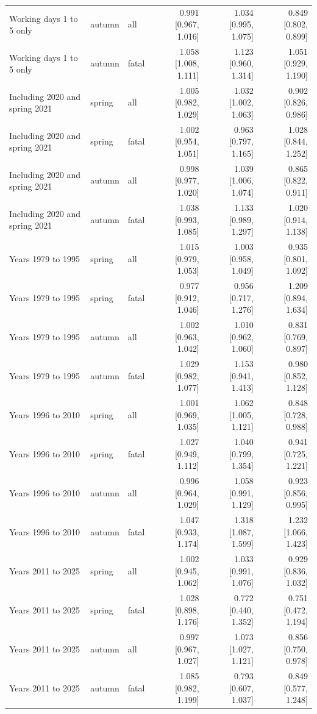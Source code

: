 \documentclass[11pt,a4paper]{article}
\begin{document}
{\begin{longtable}{p{5.6cm}llrrr}
Working days 1 to 5 only & autumn & all & 0.991 [0.967, 1.016] & 1.034 [0.995, 1.075] & 0.849 [0.802, 0.899]\\
Working days 1 to 5 only & autumn & fatal & 1.058 [1.008, 1.111] & 1.123 [0.960, 1.314] & 1.051 [0.929, 1.190]\\
Including 2020 and spring 2021 & spring & all & 1.005 [0.982, 1.029] & 1.032 [1.002, 1.063] & 0.902 [0.826, 0.986]\\
Including 2020 and spring 2021 & spring & fatal & 1.002 [0.954, 1.051] & 0.963 [0.797, 1.165] & 1.028 [0.844, 1.252]\\
Including 2020 and spring 2021 & autumn & all & 0.998 [0.977, 1.020] & 1.039 [1.006, 1.074] & 0.865 [0.822, 0.911]\\
Including 2020 and spring 2021 & autumn & fatal & 1.038 [0.993, 1.085] & 1.133 [0.989, 1.297] & 1.020 [0.914, 1.138]\\
Years 1979 to 1995 & spring & all & 1.015 [0.979, 1.053] & 1.003 [0.958, 1.049] & 0.935 [0.801, 1.092]\\
Years 1979 to 1995 & spring & fatal & 0.977 [0.912, 1.046] & 0.956 [0.717, 1.276] & 1.209 [0.894, 1.634]\\
Years 1979 to 1995 & autumn & all & 1.002 [0.963, 1.042] & 1.010 [0.962, 1.060] & 0.831 [0.769, 0.897]\\
Years 1979 to 1995 & autumn & fatal & 1.029 [0.982, 1.077] & 1.153 [0.941, 1.413] & 0.980 [0.852, 1.128]\\
Years 1996 to 2010 & spring & all & 1.001 [0.969, 1.035] & 1.062 [1.005, 1.121] & 0.848 [0.728, 0.988]\\
Years 1996 to 2010 & spring & fatal & 1.027 [0.949, 1.112] & 1.040 [0.799, 1.354] & 0.941 [0.725, 1.221]\\
Years 1996 to 2010 & autumn & all & 0.996 [0.964, 1.029] & 1.058 [0.991, 1.129] & 0.923 [0.856, 0.995]\\
Years 1996 to 2010 & autumn & fatal & 1.047 [0.933, 1.174] & 1.318 [1.087, 1.599] & 1.232 [1.066, 1.423]\\
Years 2011 to 2025 & spring & all & 1.002 [0.945, 1.062] & 1.033 [0.991, 1.076] & 0.929 [0.836, 1.032]\\
Years 2011 to 2025 & spring & fatal & 1.028 [0.898, 1.176] & 0.772 [0.440, 1.352] & 0.751 [0.472, 1.194]\\
Years 2011 to 2025 & autumn & all & 0.997 [0.967, 1.027] & 1.073 [1.027, 1.121] & 0.856 [0.750, 0.978]\\
Years 2011 to 2025 & autumn & fatal & 1.085 [0.982, 1.199] & 0.793 [0.607, 1.037] & 0.849 [0.577, 1.248]\\

\end{longtable}}
\end{document}
